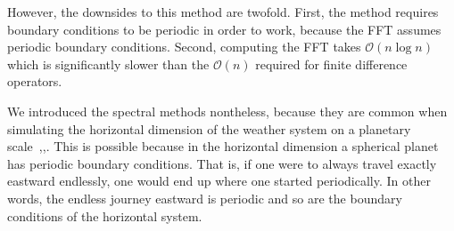 However, the downsides to this method are twofold.
First, the method requires boundary conditions to be periodic in order to work, because the FFT assumes periodic boundary conditions.
Second, computing the FFT takes $\mathcal{O}(n\log n)$ which is significantly slower than the $\mathcal{O}(n)$ required for finite difference operators.

We introduced the spectral methods nontheless, because they are common when simulating the horizontal dimension of the weather system on a planetary scale~\cite{coiffier2011fundamentals},\cite{chen1997use},\cite{shuman1989history}.
This is possible because in the horizontal dimension a spherical planet has periodic boundary conditions.
That is, if one were to always travel exactly eastward endlessly, one would end up where one started periodically.
In other words, the endless journey eastward is periodic and so are the boundary conditions of the horizontal system.

